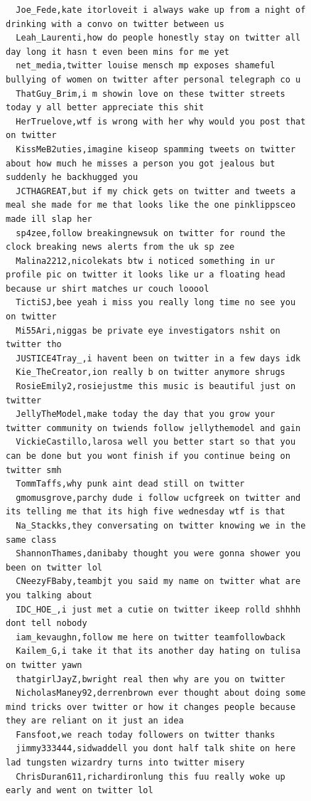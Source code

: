 \begin{figure}[htpb]
\begin{verbatim}
  Joe_Fede,kate itorloveit i always wake up from a night of drinking with a convo on twitter between us
  Leah_Laurenti,how do people honestly stay on twitter all day long it hasn t even been mins for me yet
  net_media,twitter louise mensch mp exposes shameful bullying of women on twitter after personal telegraph co u
  ThatGuy_Brim,i m showin love on these twitter streets today y all better appreciate this shit
  HerTruelove,wtf is wrong with her why would you post that on twitter
  KissMeB2uties,imagine kiseop spamming tweets on twitter about how much he misses a person you got jealous but suddenly he backhugged you
  JCTHAGREAT,but if my chick gets on twitter and tweets a meal she made for me that looks like the one pinklippsceo made ill slap her
  sp4zee,follow breakingnewsuk on twitter for round the clock breaking news alerts from the uk sp zee
  Malina2212,nicolekats btw i noticed something in ur profile pic on twitter it looks like ur a floating head because ur shirt matches ur couch looool
  TictiSJ,bee yeah i miss you really long time no see you on twitter
  Mi55Ari,niggas be private eye investigators nshit on twitter tho
  JUSTICE4Tray_,i havent been on twitter in a few days idk
  Kie_TheCreator,ion really b on twitter anymore shrugs
  RosieEmily2,rosiejustme this music is beautiful just on twitter
  JellyTheModel,make today the day that you grow your twitter community on twiends follow jellythemodel and gain
  VickieCastillo,larosa well you better start so that you can be done but you wont finish if you continue being on twitter smh
  TommTaffs,why punk aint dead still on twitter
  gmomusgrove,parchy dude i follow ucfgreek on twitter and its telling me that its high five wednesday wtf is that
  Na_Stackks,they conversating on twitter knowing we in the same class
  ShannonThames,danibaby thought you were gonna shower you been on twitter lol
  CNeezyFBaby,teambjt you said my name on twitter what are you talking about
  IDC_HOE_,i just met a cutie on twitter ikeep rolld shhhh dont tell nobody
  iam_kevaughn,follow me here on twitter teamfollowback
  Kailem_G,i take it that its another day hating on tulisa on twitter yawn
  thatgirlJayZ,bwright real then why are you on twitter
  NicholasManey92,derrenbrown ever thought about doing some mind tricks over twitter or how it changes people because they are reliant on it just an idea
  Fansfoot,we reach today followers on twitter thanks
  jimmy333444,sidwaddell you dont half talk shite on here lad tungsten wizardry turns into twitter misery
  ChrisDuran611,richardironlung this fuu really woke up early and went on twitter lol

\end{verbatim}
\end{figure}
